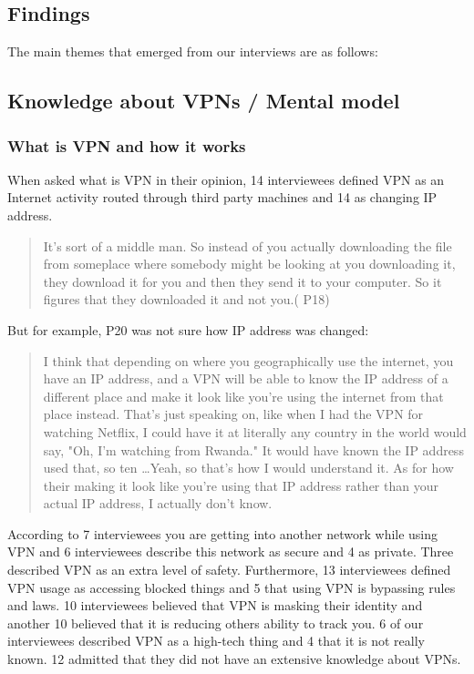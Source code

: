 \subsection{Findings}\label{Findings}
The main themes that emerged from our interviews are as follows: 

\subsection{Knowledge about VPNs / Mental model}

\subsubsection{What is VPN and how it works}

When asked what is VPN in their opinion, 14 interviewees defined VPN as an Internet activity routed through third party machines and 14 as changing IP address. 
\begin{quote}It's sort of a middle man. So instead of you actually downloading the file from someplace where somebody might be looking at you downloading it, they download it for you and then they send it to your computer. So it figures that they downloaded it and not you.( P18)\end{quote}


But for example, P20 was not sure how IP address was changed:
\begin{quote}I think that depending on where you geographically use the internet, you have an IP address, and a VPN will be able to know the IP address of a different place and make it look like you're using the internet from that place instead. That's just speaking on, like when I had the VPN for watching Netflix, I could have it at literally any country in the world would say, "Oh, I'm watching from Rwanda." It would have known the IP address used that, so ten \dots Yeah, so that's how I would understand it.
As for how their making it look like you're using that IP address rather than your actual IP address, I actually don't know.\end{quote}


According to 7 interviewees you are getting into another network while using VPN and 6 interviewees describe this network as secure and 4 as private. 
Three described VPN as an extra level of safety. Furthermore, 13 interviewees defined VPN usage as accessing blocked things and 5 that using VPN is bypassing rules and laws. 10 interviewees believed that VPN is masking their identity and another 10 believed that it is reducing others ability to track you.  6 of our interviewees described VPN as a high-tech thing and 4 that it is not really known. 12 admitted that they did not have an extensive knowledge about VPNs.

